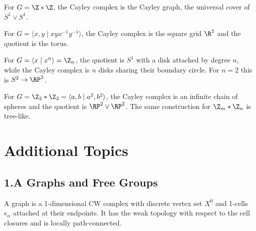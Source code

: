 \begin{example}
\label{ex:cayley-graph-free-group}
For $G=\Z*\Z$, the Cayley complex is the Cayley graph, the universal cover of
$S^1\vee S^1$.
\end{example}

\begin{example}
\label{ex:cayley-complex-torus}
For $G=\langle x,y\mid xyx^{-1}y^{-1}\rangle$, the Cayley complex is the
square grid $\R^2$ and the quotient is the torus.
\end{example}

\begin{example}
\label{ex:cayley-complex-cyclic-group}
For $G=\langle x\mid x^n\rangle=\Z_n$, the quotient is $S^1$ with a disk
attached by degree $n$, while the Cayley complex is $n$ disks sharing their
boundary circle. For $n=2$ this is $S^2\to\RP^2$.
\end{example}

\begin{example}
\label{ex:cayley-complex-infinite-dihedral}
For $G=\Z_2*\Z_2=\langle a,b\mid a^2,b^2\rangle$, the Cayley complex is an
infinite chain of spheres and the quotient is $\RP^2\vee\RP^2$. The same
construction for $\Z_m*\Z_n$ is tree-like.
\end{example}

\section*{Additional Topics}
\subsection{1.A Graphs and Free Groups}
\label{sec:graphs-and-free-groups}

\begin{definition}
\label{def:graph}
\leanok
{}
A graph is a 1-dimensional CW complex with discrete vertex set $X^0$ and
1-cells $e_\alpha$ attached at their endpoints. It has the weak topology with
respect to the cell closures and is locally path-connected.
\end{definition}

